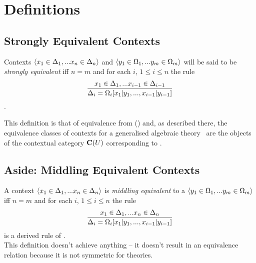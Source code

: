 \documentclass[10pt,a4paper]{scrartcl}
\begin{document}
\section{Definitions}
\subsection{Strongly Equivalent Contexts}
\begin{definition}
Contexts $\langle x_1 \in \Delta_1,... x_{n} \in \Delta_{n}\rangle$ 
and $\langle y_1 \in \Omega_1,... y_{m} \in \Omega_{m}\rangle$ will be said to be \textit{strongly equivalent} iff $n=m$ and for each $i$, $1 \leq i \leq n$ the rule 
$$
\frac{x_1 \in \Delta_1,... x_{i-1} \in \Delta_{i-1}}{\Delta_i=\Omega_i[x_1|y_1,...,x_{i-1}|y_{i-1}]}
$$
\intheory.
\end{definition}

This definition is that of equivalence from (\cite{Cartmell78})  and, as described there, the  equivalence classes of contexts for a generalised algebraic theory \gat\  are the objects of the contextual category $\mathbf{C}(U)$ corresponding to \gat.

\begin{oldtt}
\subsection{Aside: Middling Equivalent Contexts}

A context $\langle x_1 \in \Delta_1,... x_{n} \in \Delta_{n}\rangle$ 
is  \textit{middling equivalent}  to a $\langle y_1 \in \Omega_1,... y_{m} \in \Omega_{m}\rangle$ iff $n=m$ and for each $i$, $1 \leq i \leq n$ the rule 
$$
\frac{x_1 \in \Delta_1,... x_{n} \in \Delta_{n}}{\Delta_i=\Omega_i[x_1|y_1,...,x_{i-1}|y_{i-1}]}
$$
is a derived rule of \gat. \\

This definition doesn't achieve anything -- it doesn't result in an equivalence relation because it is not symmetric for 
 theories.
\end{oldtt}
\end{document}
